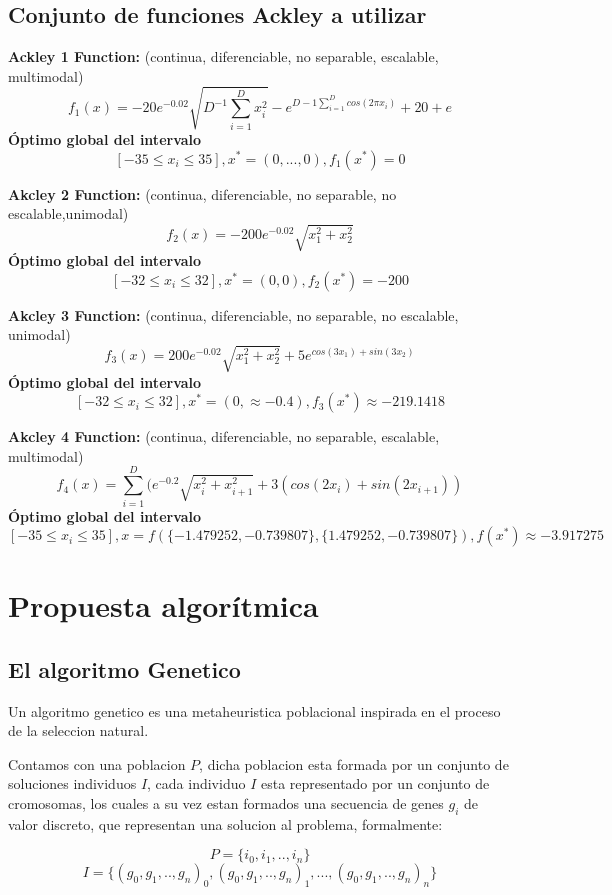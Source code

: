 \documentclass[10pt]{article}
\begin{document}
\subsection{Conjunto de funciones Ackley a utilizar}

\textbf{Ackley 1 Function: } (continua, diferenciable, no separable, escalable, multimodal)
 $$ f_1(x) = -20e^{-0.02}\sqrt{D^{-1}\sum_{i=1}^{D}x_{i}^2}-e^{D-1\sum_{i=1}^{D}cos(2\pi x_i)}+20+e$$
\textbf{Óptimo global del intervalo} 
$$[-35\leq x_i \leq 35], x^* = (0,..., 0), f_1(x^*) = 0$$

\textbf{Akcley 2  Function:  } (continua, diferenciable, no separable, no escalable,unimodal)
$$ f_2(x) = -200e^{-0.02}\sqrt{x_1^2+x_2^2}$$
\textbf{Óptimo global del intervalo}
 $$[-32\leq x_i \leq 32], x^* = (0,0), f_2(x^*) = -200$$

\textbf{Akcley 3  Function:  } (continua, diferenciable, no separable, no escalable, unimodal)
$$ f_3(x) = 200e^{-0.02}\sqrt{x_1^2+x_2^2}+5e^{cos(3x_1)+sin(3x_2)}$$
\textbf{Óptimo global del intervalo} 
$$[-32\leq x_i \leq 32], x^* = (0, \approx -0.4), f_3(x^*) \approx -219.1418$$

\textbf{Akcley 4  Function: } (continua, diferenciable, no separable, escalable, multimodal)
$$f_4(x) =  \sum_{i=1}^{D}(e^{-0.2}\sqrt{x_i^2+x_{i+1}^2}+3(cos(2x_i)+sin(2x_{i+1}))$$
\textbf{Óptimo global del intervalo} 
$$[-35\leq x_i \leq 35], x=f(\{-1.479252,-0.739807\},\{1.479252,-0.739807\}), f(x^*) \approx -3.917275$$ 

\section{Propuesta algorítmica} %

\subsection{El algoritmo Genetico}

Un algoritmo genetico es una metaheuristica poblacional inspirada en el proceso de la seleccion natural.

Contamos con una poblacion $P$, dicha poblacion esta formada por un conjunto de soluciones individuos $I$, cada individuo $I$ esta representado por un conjunto de cromosomas, los cuales a su vez estan formados una secuencia de genes $g_i$ de valor discreto, que representan una solucion al problema, formalmente:

$$P =\{i_0,i_1,..,i_n\}$$
$$I =\{(g_0,g_1,..,g_n)_0,(g_0,g_1,..,g_n)_1,...,(g_0,g_1,..,g_n)_n\}$$
\end{document}

